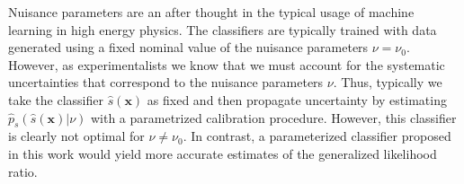 \documentclass[12pt]{article}
\numberwithin{equation}{section}
\theoremstyle{plain}
\begin{document}




Nuisance parameters are an after thought in the typical usage of machine
learning in high energy physics. The classifiers are typically trained with
data generated using a fixed nominal value of the nuisance parameters $\nu=\nu_0$.
However, as experimentalists we know that we must account for
the systematic uncertainties that correspond to the nuisance parameters
$\nu$. Thus, typically we take the classifier $\hat s(\mathbf{x})$ as fixed and then propagate
uncertainty by estimating $\hat{p}_s(\hat s(\mathbf{x}) | \nu)$ with a parametrized calibration procedure.
However, this classifier is clearly not optimal
for $\nu \ne \nu_0$. In contrast, a parameterized classifier proposed in this work
would yield more accurate estimates of the generalized likelihood ratio.
\end{document}
